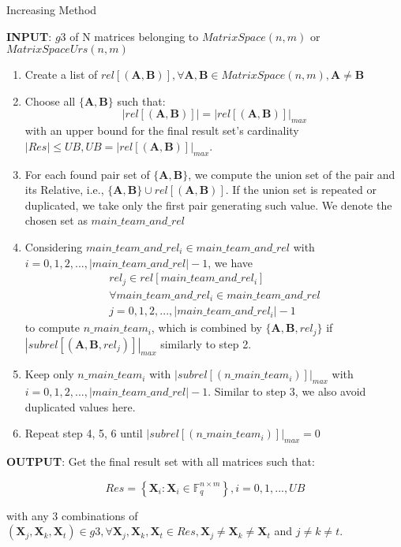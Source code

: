 \begin{algorithm}[H]
\caption{Increasing Method \label{alg:Increasing-Method}}

\textbf{INPUT}: $g3$ of N matrices belonging to $MatrixSpace(n,m)$
or $MatrixSpaceUrs(n,m)$
\begin{enumerate}
\item Create a list of $rel\left[\left(\boldsymbol{A},\boldsymbol{B}\right)\right],\forall\boldsymbol{A},\boldsymbol{B}\in MatrixSpace(n,m),\boldsymbol{A}\neq\boldsymbol{B}$
\item Choose all $\{\boldsymbol{A},\boldsymbol{B}\}$ such that:
\[
\left|rel\left[\left(\boldsymbol{A},\boldsymbol{B}\right)\right]\right|=\left|rel\left[\left(\boldsymbol{A},\boldsymbol{B}\right)\right]\right|_{max}
\]
with an upper bound for the final result set's cardinality $\left|Res\right|\leq UB,UB=\left|rel\left[\left(\boldsymbol{A},\boldsymbol{B}\right)\right]\right|_{max}$.
\item For each found pair set of $\{\boldsymbol{A},\boldsymbol{B}\}$, we
compute the union set of the pair and its Relative, i.e., $\{\boldsymbol{A},\boldsymbol{B}\}\cup rel\left[\left(\boldsymbol{A},\boldsymbol{B}\right)\right]$.
If the union set is repeated or duplicated, we take only the first
pair generating such value. We denote the chosen set as $main\_team\_and\_rel$
\item Considering $main\_team\_and\_rel_{i}\in main\_team\_and\_rel$ with
$i=0,1,2,...,\left|main\_team\_and\_rel\right|-1$, we have 
\[
\begin{array}{c}
rel_{j}\in rel\left[main\_team\_and\_rel_{i}\right]\\
\forall main\_team\_and\_rel_{i}\in main\_team\_and\_rel\\
j=0,1,2,...,\left|main\_team\_and\_rel_{i}\right|-1
\end{array}
\]
to compute $n\_main\_team_{i}$, which is combined by $\{\boldsymbol{A},\boldsymbol{B},rel_{j}\}$
if $\left|subrel\left[\left(\boldsymbol{A},\boldsymbol{B},rel_{j}\right)\right]\right|_{max}$
similarly to step 2.
\item Keep only $n\_main\_team_{i}$ with $\left|subrel\left[\left(n\_main\_team_{i}\right)\right]\right|_{max}$
with $i=0,1,2,...,\left|main\_team\_and\_rel\right|-1$. Similar to
step 3, we also avoid duplicated values here.
\item Repeat step 4, 5, 6 until $\left|subrel\left[\left(n\_main\_team_{i}\right)\right]\right|_{max}=0$
\end{enumerate}
\textbf{OUTPUT}: Get the final result set with all matrices such that:

\[
Res=\left\{ \boldsymbol{X}_{i}:\boldsymbol{X}_{i}\in\ensuremath{\mathbb{F}}_{q}^{n\times m}\right\} ,i=0,1,...,UB
\]

with any 3 combinations of $\left(\boldsymbol{X}_{j},\boldsymbol{X}_{k},\boldsymbol{X}_{t}\right)\in g3,\forall\boldsymbol{X}_{j},\boldsymbol{X}_{k},\boldsymbol{X}_{t}\in Res,\boldsymbol{X}_{j}\neq\boldsymbol{X}_{k}\neq\boldsymbol{X}_{t}$
and $j\neq k\neq t$.
\end{algorithm}

